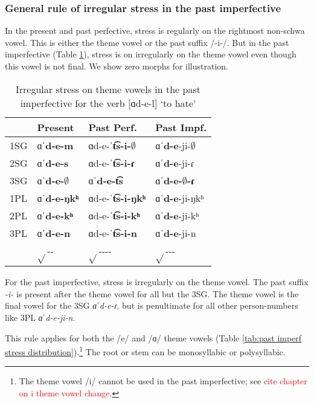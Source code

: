 \subsubsection{General rule of irregular stress in the past imperfective}\label{section:stress:verb:pastImpf:general}
In the present and past perfective, stress is regularly on the rightmost non-schwa vowel. This is either the theme vowel or the past suffix /-i-/. But in the past imperfective (Table \ref{tab:past imperf theme vowel stress}), stress is on irregularly on the theme vowel even though this vowel is not final. We show zero morphs for illustration.  

\begin{table}[H]
	\centering
	\caption{Irregular stress on theme vowels in the past imperfective for the verb [ɑd-e-l] `to hate' }
	\label{tab:past imperf theme vowel stress}
	\begin{tabular}{|l|lll|}
		\hline 
		& Present & Past Perf. & Past Impf.   \\
		\hline 
		1SG   & ɑˈ\textbf{d-e-m}& ɑd-e-ˈ\textbf{t͡s-i-$\emptyset$}& ɑˈ\textbf{d-e}-ji-$\emptyset$
		\\
		2SG   & ɑˈ\textbf{d-e-s}& ɑd-e-ˈ\textbf{t͡s-i-ɾ}& ɑˈ\textbf{d-e}-ji-ɾ
		\\
		3SG     & ɑˈ\textbf{d-e-$\emptyset$}& ɑˈ\textbf{d-e-t͡s}& ɑˈ\textbf{d-e-$\emptyset$-ɾ}
		\\
		1PL   & ɑˈ\textbf{d-e-ŋkʰ}& ɑd-e-ˈ\textbf{t͡s-i-ŋkʰ}& ɑˈ\textbf{d-e}-ji-ŋkʰ
		\\
		2PL   & ɑˈ\textbf{d-e-kʰ}& ɑd-e-ˈ\textbf{t͡s-i-kʰ}& ɑˈ\textbf{d-e}-ji-kʰ
		\\
		3PL   & ɑˈ\textbf{d-e-n}& ɑd-e-ˈ\textbf{t͡s-i-n}& ɑˈ\textbf{d-e}-ji-n
		\\
		\hline 
		& $\sqrt{}$-{\thgloss}-{\agr}& $\sqrt{}$-{\thgloss}-{\aorperf}-{\pst}-{\agr}& $\sqrt{}$-{\thgloss}-{\pst}-{\agr}
		\\ \hline 
	\end{tabular}
	
\end{table}

For the past imperfective, stress is irregularly on the theme vowel. The past suffix \textit{-i-} is present after the theme vowel for all but the 3SG. The theme vowel is the final vowel for the 3SG \textit{ɑˈd-e-ɾ}, but is penultimate for all other person-numbers like 3PL \textit{ɑˈd-e-ji-n}.  

This rule applies for both the /e/ and /ɑ/ theme vowels (Table \ref{tab:past imperf stress distribution}).\footnote{ The theme vowel /i/ cannot be used in the past imperfective; see \textcolor{red}{cite chapter on i theme vowel change}.} The root or stem can be monosyllabic or polysyllabic. 


